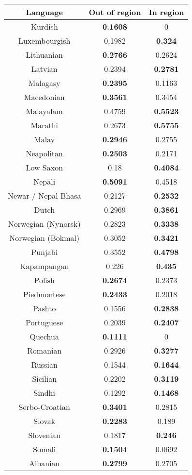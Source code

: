 \begin{figure}[h]
\begin{tabular}{ccc}\hline\hline
Language&Out of region&In region\\
\hline
Kurdish&\textbf{0.1608}&0\\
Luxembourgish&0.1982&\textbf{0.324}\\
Lithuanian&\textbf{0.2766}&0.2624\\
Latvian&0.2394&\textbf{0.2781}\\
Malagasy&\textbf{0.2395}&0.1163\\
Macedonian&\textbf{0.3561}&0.3454\\
Malayalam&0.4759&\textbf{0.5523}\\
Marathi&0.2673&\textbf{0.5755}\\
Malay&\textbf{0.2946}&0.2755\\
Neapolitan&\textbf{0.2503}&0.2171\\
Low Saxon&0.18&\textbf{0.4084}\\
Nepali&\textbf{0.5091}&0.4518\\
Newar / Nepal Bhasa&0.2127&\textbf{0.2532}\\
Dutch&0.2969&\textbf{0.3861}\\
Norwegian (Nynorsk)&0.2823&\textbf{0.3338}\\
Norwegian (Bokmal)&0.3052&\textbf{0.3421}\\
Punjabi&0.3552&\textbf{0.4798}\\
Kapampangan&0.226&\textbf{0.435}\\
Polish&\textbf{0.2674}&0.2373\\
Piedmontese&\textbf{0.2433}&0.2018\\
Pashto&0.1556&\textbf{0.2838}\\
Portuguese&0.2039&\textbf{0.2407}\\
Quechua&\textbf{0.1111}&0\\
Romanian&0.2926&\textbf{0.3277}\\
Russian&0.1544&\textbf{0.1644}\\
Sicilian&0.2202&\textbf{0.3119}\\
Sindhi&0.1292&\textbf{0.1468}\\
Serbo-Croatian&\textbf{0.3401}&0.2815\\
Slovak&\textbf{0.2283}&0.189\\
Slovenian&0.1817&\textbf{0.246}\\
Somali&\textbf{0.1504}&0.0692\\
Albanian&\textbf{0.2799}&0.2705\\

\end{tabular}
\end{figure}
